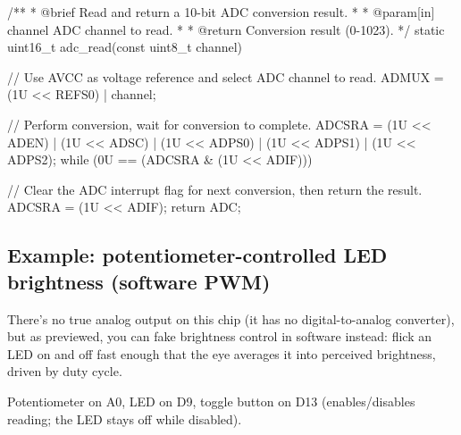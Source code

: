 \begin{ccode}
/**
 * @brief Read and return a 10-bit ADC conversion result.
 *
 * @param[in] channel ADC channel to read.
 *
 * @return Conversion result (0-1023).
 */
static uint16_t adc_read(const uint8_t channel)
{
    // Use AVCC as voltage reference and select ADC channel to read.
    ADMUX = (1U << REFS0) | channel;

    // Perform conversion, wait for conversion to complete.
    ADCSRA = (1U << ADEN) | (1U << ADSC) | (1U << ADPS0) | (1U << ADPS1) | (1U << ADPS2);
    while (0U == (ADCSRA & (1U << ADIF))) {}

    // Clear the ADC interrupt flag for next conversion, then return the result.
    ADCSRA = (1U << ADIF);
    return ADC;
}
\end{ccode}

\subsection{Example: potentiometer-controlled LED brightness (software PWM)}
\label{c4:a:4}
There's no true analog output on this chip (it has no digital-to-analog converter), but as
 previewed, you can fake brightness control in software instead: flick an LED on and
off fast enough that the eye averages it into perceived brightness, driven by duty cycle.

Potentiometer on A0, LED on D9, toggle button on D13 (enables/disables reading; the LED stays off
while disabled).


